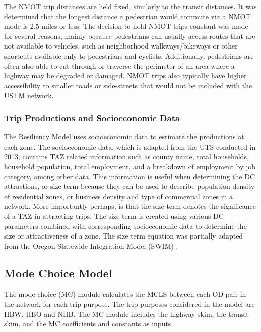 The NMOT trip distances are held fixed, similarly to the transit distances. It was
determined that the longest distance a pedestrian would commute via a NMOT
mode is 2.5 miles or less. The decision to hold NMOT
trips constant was made for several reasons, mainly because pedestrians can usually
access routes that are not available to vehicles, such as neighborhood walkways/bikeways
or other shortcuts available only to pedestrians and cyclists. Additionally,
pedestrians are often also able to cut through or traverse the perimeter of an
area where a highway may be degraded or damaged. NMOT trips also typically have
higher accessibility to smaller roads or side-streets that would not be included
with the USTM network.

\subsubsection{Trip Productions and Socioeconomic Data}

The Resiliency Model uses socioeconomic data to estimate the productions at
each zone. The socioeconomic data, which is adapted from the UTS conducted in 2013, contains TAZ related information such
as county name, total households, household population, total employment,
and a breakdown of employment by job category, among other data. This information is useful
when determining the DC attractions, or size term because they can be used to
describe population density of residential zones, or business density and type
of commercial zones in a network. More importantly perhaps, is that the size
term denotes the significance of a TAZ in attracting trips. The size term is
created using various DC parameters combined with corresponding socioeconomic data
to determine the size or attractiveness of a zone. The size term equation was partially
adapted from the Oregon Statewide Integration Model (SWIM) \citep{swimversion}.

\subsection{Mode Choice Model}

The mode choice (MC) module calculates the MCLS between each OD pair in the
network for each trip purpose. The trip purposes considered in the model are HBW, HBO and NHB. The MC module includes the highway skim,
the transit skim, and the MC coefficients and constants as inputs.

